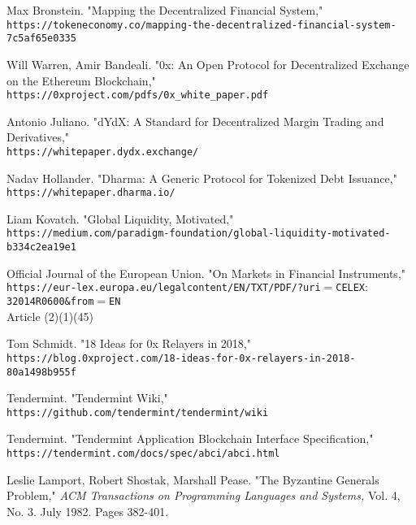 \documentclass[9pt]{article}
\begin{document}
\begin{thebibliography}{9}

Max Bronstein. "Mapping the Decentralized Financial System,"
\\\texttt{https://tokeneconomy.co/mapping-the-decentralized-financial-system-7c5af65e0335}

Will Warren, Amir Bandeali. "0x: An Open Protocol for Decentralized Exchange on the Ethereum Blockchain,"
\\\texttt{https://0xproject.com/pdfs/0x\_white\_paper.pdf}

Antonio Juliano. "dYdX: A Standard for Decentralized Margin Trading and Derivatives,"
\\\texttt{https://whitepaper.dydx.exchange/}

Nadav Hollander. "Dharma: A Generic Protocol for Tokenized Debt Issuance,"
\\\texttt{https://whitepaper.dharma.io/}

Liam Kovatch. "Global Liquidity, Motivated,"
\\\texttt{https://medium.com/paradigm-foundation/global-liquidity-motivated-b334c2ea19e1}

Official Journal of the European Union. "On Markets in Financial Instruments,"
\\\texttt{https://eur-lex.europa.eu/legal\-content/EN/TXT/PDF/?uri$=$CELEX$:$32014R0600\&from$=$EN}
\\ Article (2)(1)(45)

Tom Schmidt. "18 Ideas for 0x Relayers in 2018,"
\\\texttt{https://blog.0xproject.com/18-ideas-for-0x-relayers-in-2018-80a1498b955f}

Tendermint. "Tendermint Wiki,"
\\\texttt{https://github.com/tendermint/tendermint/wiki}

Tendermint. "Tendermint Application Blockchain Interface Specification,"
\\\texttt{https://tendermint.com/docs/spec/abci/abci.html}

Leslie Lamport, Robert Shostak, Marshall Pease. "The Byzantine Generals Problem,"
\textit{ACM Transactions on Programming Languages and Systems, }Vol. 4, No. 3. July 1982. Pages 382-401.


\end{thebibliography}
\end{document}
